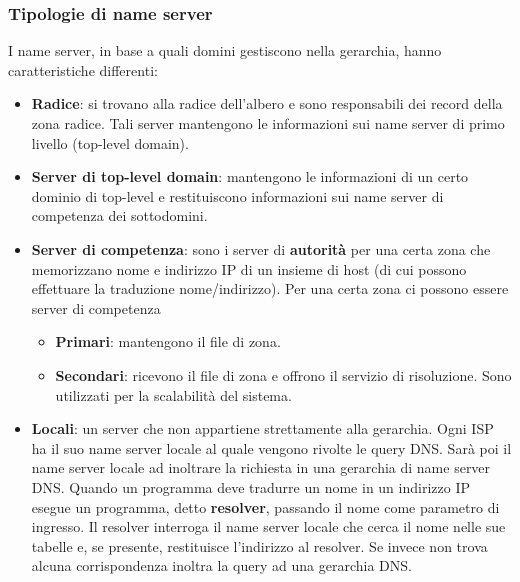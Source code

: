 \subsubsection{Tipologie di name server}
I name server, in base a quali domini gestiscono nella gerarchia, hanno
caratteristiche differenti:
\begin{itemize}
	\item \textbf{Radice}: si trovano alla radice dell'albero e sono 
		responsabili dei record della zona radice. Tali server 
		mantengono le informazioni sui name server di primo livello
		(top-level domain).
	\item \textbf{Server di top-level domain}: mantengono le 
		informazioni di un certo dominio di top-level e restituiscono 
		informazioni sui name server di competenza dei sottodomini.
	\item \textbf{Server di competenza}: sono i server di 
		\textbf{autorità} per una certa zona che memorizzano nome e 
		indirizzo IP di un insieme di host (di cui possono effettuare 
		la traduzione nome/indirizzo). Per una certa zona ci possono 
		essere server di competenza
	      \begin{itemize}
		      \item \textbf{Primari}: mantengono il file di zona.
		      \item \textbf{Secondari}: ricevono il file di zona e 
				  offrono il servizio di risoluzione. Sono utilizzati 
				  per la scalabilità del sistema.
	      \end{itemize}
	\item \textbf{Locali}: un server che non appartiene strettamente 
		alla gerarchia. Ogni ISP ha il suo name server locale al quale
		vengono rivolte le query DNS. Sarà poi il name server locale 
		ad inoltrare la richiesta in una gerarchia di name server DNS.
		Quando un programma deve tradurre un nome in un indirizzo IP 
		esegue un programma, detto \textbf{resolver}, passando il nome 
		come parametro di ingresso. Il resolver interroga il name
		server locale che cerca il nome nelle sue tabelle e, se 
		presente, restituisce l'indirizzo al resolver. Se invece non
		trova alcuna corrispondenza inoltra la query ad una gerarchia
		DNS.
\end{itemize}

